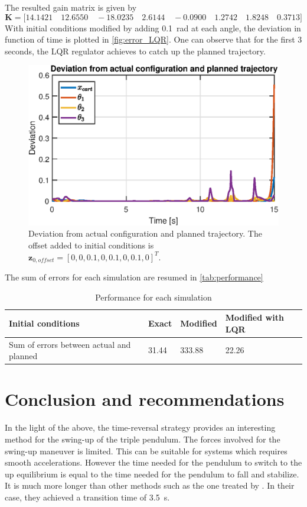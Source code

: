 \documentclass[a4paper,12pt]{article}
\begin{document}
The resulted gain matrix is given by
\begin{equation}
\mathbf{K}=\big[14.1421\quad12.6550\quad-18.0235\quad2.6144\quad-0.0900\quad1.2742\quad1.8248\quad0.3713\big]
\end{equation}
With initial conditions modified by adding \SI{0.1}{\radian} at each angle, the deviation in function of time is plotted in \autoref{fig:error_LQR}. One can observe that for the first 3 seconds, the LQR regulator achieves to catch up the planned trajectory.
\begin{figure}[h]
	\centering
	\includegraphics[width=12cm]{illustrations/graph_error_LQR.eps}
	\caption{Deviation from actual configuration and planned trajectory. The offset added to initial conditions is $\mathbf{z}_{0,offset}=[0,0,0.1,0,0.1,0,0.1,0]^T$.}
	\label{fig:error_LQR}
\end{figure}

The sum of errors for each simulation are resumed in \autoref{tab:performance}
\begin{table}[H]
\centering
\caption{Performance for each simulation}
\label{tab:performance}
\begin{tabular}{|l|l|l|l|}
\hline
Initial conditions                       & Exact & Modified & Modified with LQR \\ \hline
Sum of errors between actual and planned & 31.44 & 333.88   & 22.26             \\ \hline
\end{tabular}
\end{table}
\newpage
\section{Conclusion and recommendations}
In the light of the above, the time-reversal strategy provides an interesting method for the swing-up of the triple pendulum. The forces involved for the swing-up maneuver is limited. This can be suitable for systems which requires smooth accelerations. However the time needed for the pendulum to switch to the up equilibrium is equal to the time needed for the pendulum to fall and stabilize. It is much more longer than other methods such as the one treated by \citet{Gluck2013801}. In their case, they achieved a transition time of \SI{3.5}{\second}.
\end{document}
